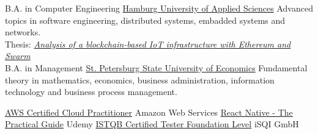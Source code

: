 \begin{minipage}[t]{0.5\textwidth}
\begin{entrylist}
   {B.A. in Computer Engineering} {\href{https://www.haw-hamburg.de/en/}{Hamburg University of Applied Sciences}} {
    Advanced topics in software engineering, distributed systems, embadded systems and networks.\\
    Thesis: {\href{https://docplayer.org/204520791-Bachelorarbeit-artur-iablokov-kostenanalyse-einer-blockchain-basierten-iot-infrastruktur-mit-ethereum-und-swarm.html}{\emph{Analysis of a blockchain-based IoT infrastructure with Ethereum and Swarm}}}
  }
  \\
   {B.A. in Management} {\href{https://en.unecon.ru/}{St. Petersburg State University of Economics}} {
    Fundamental theory in mathematics, economics, business administration, information technology and business process management.
  }
\end{entrylist}
\end{minipage}
\hfill
\begin{minipage}[t]{0.45\textwidth}
  \begin{entrylist}
     {\href{https://www.credly.com/badges/40fba880-de13-489d-9936-c88cbd59e2d0/}{AWS Certified Cloud Practitioner}} {Amazon Web Services}
     {\href{https://www.udemy.com/certificate/UC-3d1f5088-e87b-4102-8e59-b39df95a5a84/}{React Native - The Practical Guide}} {Udemy}
     {\href{https://app.skillsclub.com/credential/26298-c17cec9e406f32f3ca718dc1ef4aae6d20339ce6fc4964f67f030a661d24137d?locale=de&badge=true}{ISTQB Certified Tester Foundation Level}} {iSQI GmbH}
  \end{entrylist}
\end{minipage}



